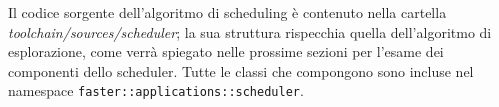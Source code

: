 Il codice sorgente dell'algoritmo di scheduling è contenuto nella cartella 
\emph{toolchain/sources/scheduler}; la sua struttura rispecchia quella 
dell'algoritmo di esplorazione, come verrà spiegato nelle prossime sezioni per 
l'esame dei componenti dello scheduler. Tutte le classi che compongono 
sono incluse nel namespace \verb+faster::applications::scheduler+.



